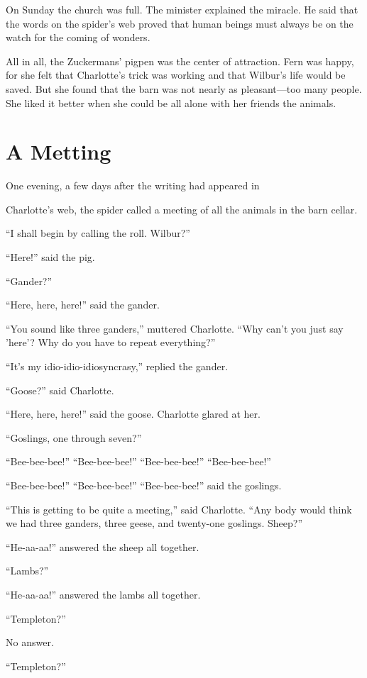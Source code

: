 \documentclass[a4paper, oneside]{book}
\begin{document}
On Sunday the church was full. The minister explained the
miracle. He said that the words on the spider's web proved that
human beings must always be on the watch for the coming of
wonders.

All in all, the Zuckermans' pigpen was the center of attraction.
Fern was happy, for she felt that Charlotte's trick was working and
that Wilbur's life would be saved. But she found that the barn was
not nearly as pleasant---too many people. She liked it better when
she could be all alone with her friends the animals.


 \chapter{A Metting}
 
One evening, a few days after the writing had appeared in

Charlotte's web, the spider called a meeting of all the animals in
the barn cellar.

``I shall begin by calling the roll. Wilbur?''

``Here!'' said the pig.

``Gander?''

``Here, here, here!'' said the gander.

``You sound like three ganders,'' muttered Charlotte. ``Why can't
you just say 'here'? Why do you have to repeat everything?''

``It's my idio-idio-idiosyncrasy,'' replied the gander.

``Goose?'' said Charlotte.

``Here, here, here!'' said the goose. Charlotte glared at her.

``Goslings, one through seven?''

``Bee-bee-bee!'' ``Bee-bee-bee!'' ``Bee-bee-bee!'' ``Bee-bee-bee!''

``Bee-bee-bee!'' ``Bee-bee-bee!'' ``Bee-bee-bee!'' said the goslings.

``This is getting to be quite a meeting,'' said Charlotte. ``Any body
would think we had three ganders, three geese, and twenty-one
goslings. Sheep?''

``He-aa-aa!'' answered the sheep all together.

``Lambs?''

``He-aa-aa!'' answered the lambs all together.

``Templeton?''

No answer.

``Templeton?''
\end{document}
